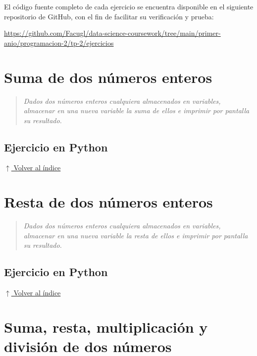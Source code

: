 \documentclass[12pt]{article}
\newcommand{\codigopython}[2]{%
}
\newcommand{\volverindice}{%
    \vspace{1em}%
    \begin{flushright}%
        \hyperlink{indice}{\small $\uparrow$ Volver al índice}%
    \end{flushright}%
}
\newcommand{\enunciado}[1]{%
    \begin{quote}
        \itshape #1
    \end{quote}
}
\begin{document}
El código fuente completo de cada ejercicio se encuentra disponible en el siguiente repositorio de GitHub, con el fin de facilitar su verificación y prueba:

\begin{center}
    \url{https://github.com/Facugl/data-science-coursework/tree/main/primer-anio/programacion-2/tp-2/ejercicios}
\end{center}


\newpage
\section{Suma de dos números enteros}

\enunciado{Dados dos números enteros cualquiera almacenados en variables, almacenar en una nueva variable la suma de ellos e imprimir por pantalla su resultado.}

\subsection*{Ejercicio en Python}

\codigopython{01}{Suma de dos números enteros}

\volverindice
\newpage


\section{Resta de dos números enteros}

\enunciado{Dados dos números enteros cualquiera almacenados en variables, almacenar en una nueva variable la resta de ellos e imprimir por pantalla su resultado.}

\subsection*{Ejercicio en Python}

\codigopython{02}{Resta de dos números enteros}

\volverindice
\newpage


\section{Suma, resta, multiplicación y división de dos números}
\end{document}
